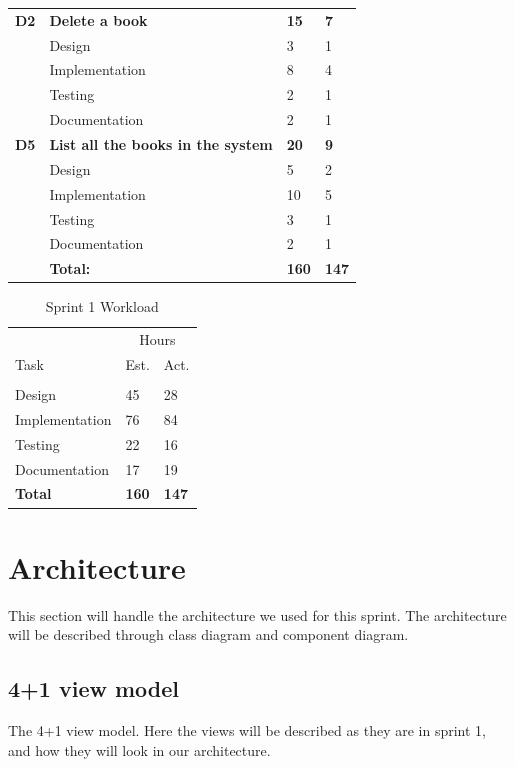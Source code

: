 \begin{table}
\begin{tabular}{ l p{8cm} l l }
\bf{D2}	  &\bf{Delete a book}				&\bf{15}		&\bf{7}		     \\
		  &Design							&3			&1		\\
		  &Implementation					&8			&4		\\
		  &Testing						&2			&1		\\
		  &Documentation					&2			&1		\\

 \bf{D5}	  &\bf{List all the books in the system}	&\bf{20}		&\bf{9}		     \\
		  &Design							&5			&2		\\
		  &Implementation					&10			&5		\\
		  &Testing						&3			&1		\\
		  &Documentation					&2			&1		\\
\hline 
		  &\bf{Total:}						&\bf{160}		&\bf{147}		\\
\hline
\end{tabular}
\label{table:sp1backlog}
\end{table}

\begin{table}
\caption{Sprint 1 Workload}
\centering
\begin{tabular}{ l l l }
\hline 
			&\multicolumn{2}{c}{Hours}			\\
 Task		&Est.			&Act.	                               \\ 
\hline \\ [-2.0ex]
Design			&45		&28		\\
Implementation	&76		&84		\\
Testing			&22		&16		\\
Documentation	&17		&19		\\
\hline
\bf{Total}			&\bf{160}	&\bf{147}		\\
\hline
\end{tabular}
\label{table:sp1workload}
\end{table}


\section{Architecture}
This section will handle the architecture we used for this sprint. The architecture will be described through class diagram and component diagram.


\subsection{4+1 view model}
The 4+1 view model\cite{Kruchten}. Here the views will be described as they are in sprint 1, and how they will look in our architecture. 

